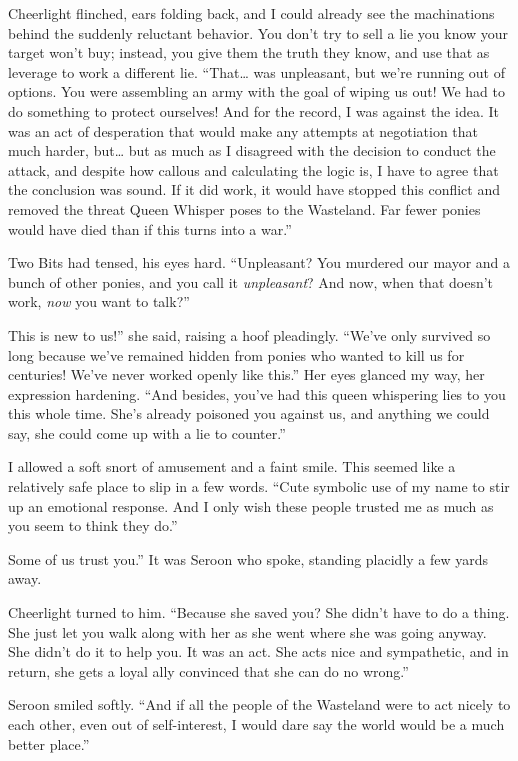 Cheerlight flinched, ears folding back, and I could already see the machinations behind the suddenly reluctant behavior. You don’t try to sell a lie you know your target won’t buy; instead, you give them the truth they know, and use that as leverage to work a different lie. “That… was unpleasant, but we’re running out of options. You were assembling an army with the goal of wiping us out! We had to do something to protect ourselves! And for the record, I was against the idea. It was an act of desperation that would make any attempts at negotiation that much harder, but… but as much as I disagreed with the decision to conduct the attack, and despite how callous and calculating the logic is, I have to agree that the conclusion was sound. If it did work, it would have stopped this conflict and removed the threat Queen Whisper poses to the Wasteland. Far fewer ponies would have died than if this turns into a war.”

Two Bits had tensed, his eyes hard. “Unpleasant? You murdered our mayor and a bunch of other ponies, and you call it \textit{unpleasant}? And now, when that doesn’t work, \textit{now} you want to talk?”

\leavevmode{}This is new to us!” she said, raising a hoof pleadingly. “We’ve only survived so long because we’ve remained hidden from ponies who wanted to kill us for centuries! We’ve never worked openly like this.” Her eyes glanced my way, her expression hardening. “And besides, you’ve had this queen whispering lies to you this whole time. She’s already poisoned you against us, and anything we could say, she could come up with a lie to counter.”

I allowed a soft snort of amusement and a faint smile. This seemed like a relatively safe place to slip in a few words. “Cute symbolic use of my name to stir up an emotional response. And I only wish these people trusted me as much as you seem to think they do.”

\leavevmode{}Some of us trust you.” It was Seroon who spoke, standing placidly a few yards away.

Cheerlight turned to him. “Because she saved you? She didn’t have to do a thing. She just let you walk along with her as she went where she was going anyway. She didn’t do it to help you. It was an act. She acts nice and sympathetic, and in return, she gets a loyal ally convinced that she can do no wrong.”

Seroon smiled softly. “And if all the people of the Wasteland were to act nicely to each other, even out of self-interest, I would dare say the world would be a much better place.”

